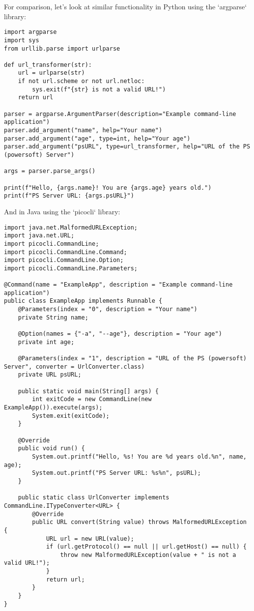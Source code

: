 For comparison, let's look at similar functionality in Python using the `argparse` library:

\begin{verbatim}
import argparse
import sys
from urllib.parse import urlparse

def url_transformer(str):
    url = urlparse(str)
    if not url.scheme or not url.netloc:
        sys.exit(f"{str} is not a valid URL!")
    return url

parser = argparse.ArgumentParser(description="Example command-line application")
parser.add_argument("name", help="Your name")
parser.add_argument("age", type=int, help="Your age")
parser.add_argument("psURL", type=url_transformer, help="URL of the PS (powersoft) Server")

args = parser.parse_args()

print(f"Hello, {args.name}! You are {args.age} years old.")
print(f"PS Server URL: {args.psURL}")
\end{verbatim}

And in Java using the `picocli` library:

\begin{verbatim}
import java.net.MalformedURLException;
import java.net.URL;
import picocli.CommandLine;
import picocli.CommandLine.Command;
import picocli.CommandLine.Option;
import picocli.CommandLine.Parameters;

@Command(name = "ExampleApp", description = "Example command-line application")
public class ExampleApp implements Runnable {
    @Parameters(index = "0", description = "Your name")
    private String name;

    @Option(names = {"-a", "--age"}, description = "Your age")
    private int age;

    @Parameters(index = "1", description = "URL of the PS (powersoft) Server", converter = UrlConverter.class)
    private URL psURL;

    public static void main(String[] args) {
        int exitCode = new CommandLine(new ExampleApp()).execute(args);
        System.exit(exitCode);
    }

    @Override
    public void run() {
        System.out.printf("Hello, %s! You are %d years old.%n", name, age);
        System.out.printf("PS Server URL: %s%n", psURL);
    }

    public static class UrlConverter implements CommandLine.ITypeConverter<URL> {
        @Override
        public URL convert(String value) throws MalformedURLException {
            URL url = new URL(value);
            if (url.getProtocol() == null || url.getHost() == null) {
                throw new MalformedURLException(value + " is not a valid URL!");
            }
            return url;
        }
    }
}
\end{verbatim}

